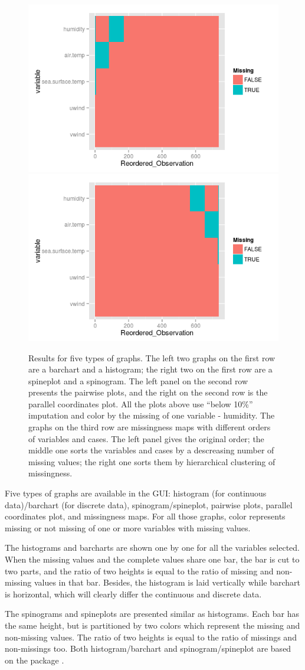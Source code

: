\documentclass[article]{jss}
\begin{document}
\begin{center}
\begin{figure}[h]
\begin{centering}
\includegraphics[width=.32\textwidth]{fig5-3-2}
\includegraphics[width=.32\textwidth]{fig5-3-3}
\par\end{centering}
\caption{Results for five types of graphs.
The left two graphs on the first row are a barchart and a histogram; the right two on the first row are a spineplot and a spinogram. The left panel on the second row presents the pairwise plots, and the right on the second row is the parallel coordinates plot. All the plots above use ``below 10\%'' imputation and color by the missing of one variable - humidity. The graphs on the third row are missingness maps with different orders of variables and cases. The left panel gives the original order; the middle one sorts the variables and cases by a descreasing number of missing values; the right one sorts them by hierarchical clustering of missingness.}
\label{fig:graphtypes}
\end{figure}
\par\end{center}

Five types of graphs are available in the GUI: histogram (for continuous data)/barchart (for discrete data), spinogram/spineplot, pairwise plots, parallel coordinates plot, and missingness maps. For all those graphs, color represents missing or not missing of one or more variables with missing values. 

The histograms and barcharts are shown one by one for all the variables selected. When the missing values and the complete values share one bar, the bar is cut to two parts, and the ratio of two heights is equal to the ratio of missing and non-missing values in that bar. Besides, the histogram is laid vertically while barchart is horizontal, which will clearly differ the continuous and discrete data.

The spinograms and spineplots are presented similar as histograms. Each bar has the same height, but is partitioned by two colors which represent the missing and non-missing values. The ratio of two heights is equal to the ratio of missings and non-missings too. Both histogram/barchart and spinogram/spineplot are based on the package  \citep{ggplot2}.
\end{document}
